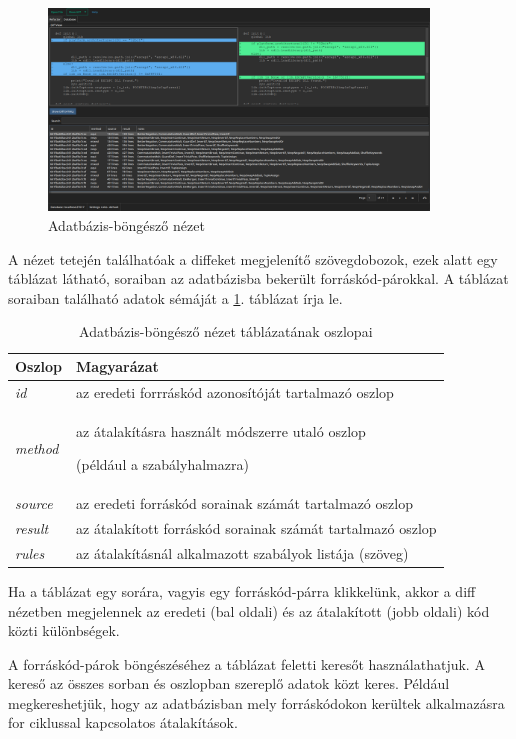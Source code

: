 \begin{figure}[H]
	\centering
	\includegraphics[width=0.9\textwidth]{images/screenshots/database_tab.png}
	\caption{Adatbázis-böngésző nézet}
\end{figure}

A nézet tetején találhatóak a diffeket megjelenítő szövegdobozok, ezek alatt
egy táblázat látható, soraiban az adatbázisba bekerült forráskód-párokkal.
A táblázat soraiban található adatok sémáját a \ref{tab:schema}. táblázat írja le.

\begin{table}[H]
	\centering
	\begin{tabular}{ | m{} | m{} | }
		\hline
		\textbf{Oszlop} & \textbf{Magyarázat} \\
		\hline \hline

		\emph{id}
		& az eredeti forrráskód azonosítóját tartalmazó oszlop \\
		\hline
		
		\emph{method}
		& az átalakításra használt módszerre utaló oszlop
		
		(például a szabályhalmazra) \\
		\hline
		
		\emph{source}
		& az eredeti forráskód sorainak számát tartalmazó oszlop \\
		\hline
		
		\emph{result}
		& az átalakított forráskód sorainak számát tartalmazó oszlop \\
		\hline
		
		\emph{rules}
		& az átalakításnál alkalmazott szabályok listája (szöveg) \\
		\hline
	\end{tabular}
	\caption{Adatbázis-böngésző nézet táblázatának oszlopai}
	\label{tab:schema}
\end{table}

Ha a táblázat egy sorára, vagyis egy forráskód-párra klikkelünk, akkor a diff nézetben megjelennek
az eredeti (bal oldali) és az átalakított (jobb oldali) kód közti különbségek.

A forráskód-párok böngészéséhez a táblázat feletti keresőt használathatjuk.
A kereső az összes sorban és oszlopban szereplő adatok közt keres.
Például megkereshetjük, hogy az adatbázisban mely forráskódokon kerültek alkalmazásra
for ciklussal kapcsolatos átalakítások.
